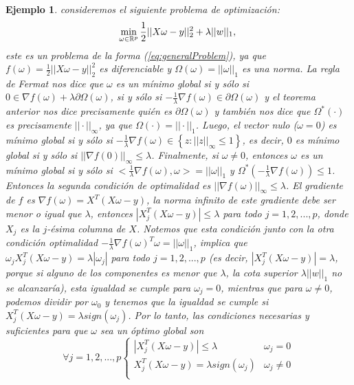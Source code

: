 \documentclass[12pt,draftcls, onecolumn, letterpaper,compsoc]{IEEEtran}
\newtheorem{example}{\textbf{Ejemplo}}
\begin{document}
\begin{example}
    consideremos el siguiente problema de optimizaci\'{o}n:\\
    \begin{displaymath}
        \min_{\omega\in \mathbb{R}^{p}} \frac{1}{2}||X\omega - y||_{2}^{2} + \lambda ||w||_1,\\
    \end{displaymath}
    este es un problema de la forma (\ref{eq:generalProblem}), ya que $f(\omega)=\frac{1}{2}||X\omega - y||_{2}^{2}$ es diferenciable y $\Omega(\omega)=||\omega||_1$ es una norma. La regla de Fermat nos dice que $\omega$ es un m\'{i}nimo global si y s\'{o}lo si $0\in \nabla f(\omega) + \lambda \partial\Omega(\omega)$, si y s\'{o}lo si $-\frac{1}{\lambda}\nabla f(\omega) \in \partial \Omega(\omega)$ y el teorema anterior nos dice precisamente qui\'{e}n es $\partial\Omega(\omega)$ y tambi\'{e}n nos dice que $\Omega^{*}(\cdot)$ es precisamente $||\cdot||_{\infty}$, ya que $\Omega(\cdot) = ||\cdot||_1$. Luego, el vector nulo ($\omega=0$) es m\'{i}nimo global si y s\'{o}lo si $-\frac{1}{\lambda}\nabla f(\omega) \in \left\lbrace z: ||z||_{\infty} \leq 1\right\rbrace$, es decir, $0$ es m\'{i}nimo global si y s\'{o}lo si $||\nabla f(0)||_{\infty}\leq \lambda$. Finalmente, si $\omega\neq 0$, entonces $\omega$ es un m\'{i}nimo global si y s\'{o}lo si $<\frac{1}{\lambda}\nabla f(\omega),\omega>=||\omega||_1$ y $\Omega^{*}(-\frac{1}{\lambda}\nabla f(\omega))\leq 1$. Entonces la segunda condici\'{o}n de optimalidad es $||\nabla f(\omega)||_{\infty}\leq \lambda$. El gradiente de $f$ es $\nabla f(\omega) =X^{T}(X\omega - y)$, la norma infinito de este gradiente debe ser menor o igual que $\lambda$, entonces $|X_{j}^{T}(X\omega - y)|\leq \lambda$ para todo $j=1,2,...,p$, donde $X_j$ es la $j$-\'{e}sima columna de $X$. Notemos que esta condici\'{o}n junto con la otra condici\'{o}n optimalidad $-\frac{1}{\lambda}\nabla f(\omega)^{T}\omega = ||\omega||_1$, implica que $\omega_j X_{j}^{T}(X\omega - y) = \lambda|\omega_j|$ para todo $j=1,2,...,p$ (es decir, $|X_{j}^{T}(X\omega - y)| = \lambda$, porque si alguno de los componentes es menor que $\lambda$, la cota superior $\lambda ||w||_1$ no se alcanzar\'{i}a), esta igualdad se cumple para $\omega_j = 0$, mientras que para $\omega\neq 0$, podemos dividir por $\omega_0$ y tenemos que la igualdad se cumple si $X_{j}^{T}(X\omega - y) = \lambda sign(\omega_j)$. Por lo tanto, las condiciones necesarias y suficientes para que $\omega$ sea un \'{o}ptimo global son
    \begin{displaymath}
        \forall j=1,2,...,p \left\lbrace
        \begin{array}{ll}
            |X_j^{T}(X\omega - y)| \leq \lambda & \omega_j = 0\\
            X_j^{T}(X\omega - y) = \lambda sign(\omega_j) & \omega_j \neq 0\\
        \end{array}\right.
    \end{displaymath}


\end{example}
\end{document}
